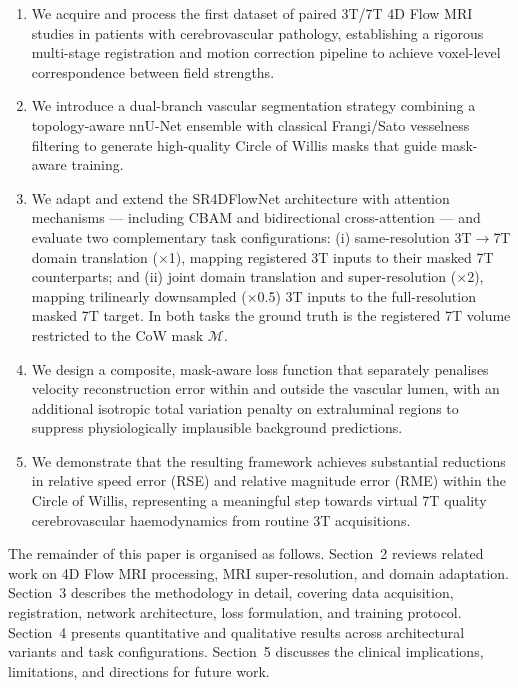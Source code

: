 \begin{enumerate}
    \item We acquire and process the first dataset of paired 3T/7T 4D Flow MRI studies in patients with cerebrovascular pathology, establishing a rigorous multi-stage registration and motion correction pipeline to achieve voxel-level correspondence between field strengths.

    \item We introduce a dual-branch vascular segmentation strategy combining a topology-aware nnU-Net ensemble \cite{isensee2021nnunet,yang2023topcow} with classical Frangi/Sato vesselness filtering \cite{frangi1998,sato1998} to generate high-quality Circle of Willis masks that guide mask-aware training.

    \item We adapt and extend the SR4DFlowNet architecture \cite{ferdian2020,elahmar2023} with attention mechanisms --- including CBAM \cite{woo2018cbam} and bidirectional cross-attention \cite{vaswani2017attention} --- and evaluate two complementary task configurations: (i) same-resolution 3T$\to$7T domain translation ($\times$1), mapping registered 3T inputs to their masked 7T counterparts; and (ii) joint domain translation and super-resolution ($\times$2), mapping trilinearly downsampled ($\times$0.5) 3T inputs to the full-resolution masked 7T target. In both tasks the ground truth is the registered 7T volume restricted to the CoW mask $\mathcal{M}$.

    \item We design a composite, mask-aware loss function that separately penalises velocity reconstruction error within and outside the vascular lumen, with an additional isotropic total variation penalty \cite{rudin1992tv} on extraluminal regions to suppress physiologically implausible background predictions.

    \item We demonstrate that the resulting framework achieves substantial reductions in relative speed error (RSE) and relative magnitude error (RME) within the Circle of Willis, representing a meaningful step towards virtual 7T quality cerebrovascular haemodynamics from routine 3T acquisitions.
\end{enumerate}

The remainder of this paper is organised as follows. Section~2 reviews related work on 4D Flow MRI processing, MRI super-resolution, and domain adaptation. Section~3 describes the methodology in detail, covering data acquisition, registration, network architecture, loss formulation, and training protocol. Section~4 presents quantitative and qualitative results across architectural variants and task configurations. Section~5 discusses the clinical implications, limitations, and directions for future work.



